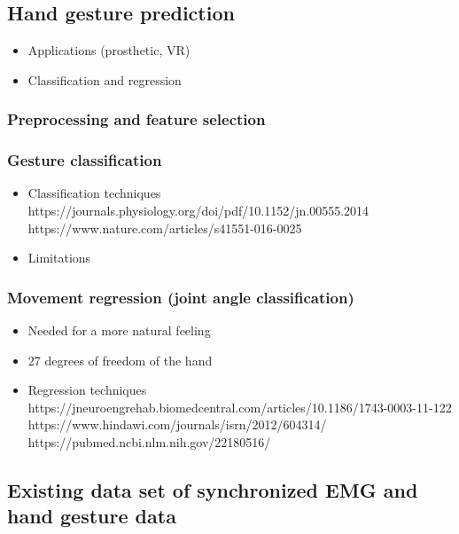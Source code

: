 \documentclass{article}
\begin{document}
\subsection{Hand gesture prediction}

\begin{itemize}
    \item Applications (prosthetic, VR)
    \item Classification and regression
\end{itemize}

\subsubsection{Preprocessing and feature selection}

\subsubsection{Gesture classification}

\begin{itemize}
    \item Classification techniques \\
    https://journals.physiology.org/doi/pdf/10.1152/jn.00555.2014 \\
    https://www.nature.com/articles/s41551-016-0025
    \item Limitations
\end{itemize}


\subsubsection{Movement regression (joint angle classification)}

\begin{itemize}
    \item Needed for a more natural feeling
    \item 27 degrees of freedom of the hand
    \item Regression techniques \\
    https://jneuroengrehab.biomedcentral.com/articles/10.1186/1743-0003-11-122 \\
    https://www.hindawi.com/journals/isrn/2012/604314/ \\
    https://pubmed.ncbi.nlm.nih.gov/22180516/
\end{itemize}



\subsection{Existing data set of synchronized EMG and hand gesture data}
\end{document}
